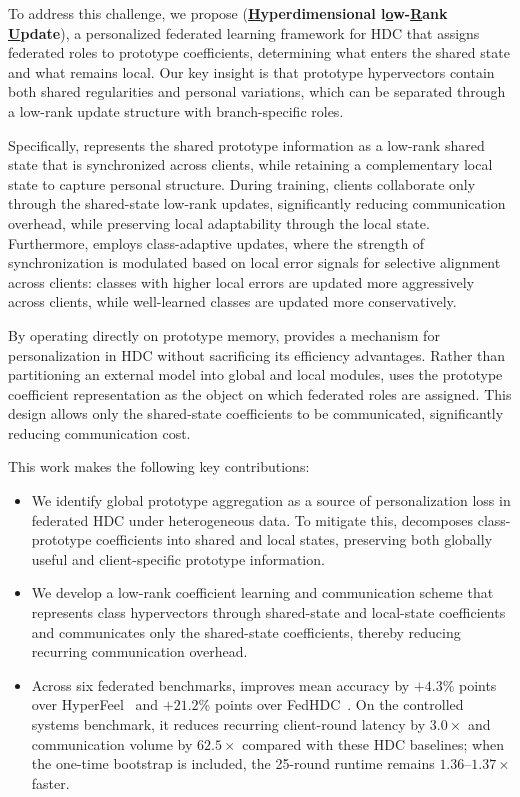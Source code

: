 \documentclass[lettersize,journal]{IEEEtran}
\newcommand{\rev}[1]{#1}
\begin{document}
To address this challenge, we propose \Design (\textbf{\underline{H}yperdimensional l\underline{o}w-\underline{R}ank \underline{U}pdate}), a personalized federated learning framework for HDC that \rev{assigns federated roles to prototype coefficients, determining what enters the shared state and what remains local}.
Our key insight is that prototype hypervectors contain both \rev{shared regularities and personal variations}, which can be separated through a low-rank update structure \rev{with branch-specific roles}.

Specifically, \Design represents the \rev{shared prototype information} as a low-rank \rev{shared state} that is synchronized across clients, while retaining a complementary \rev{local state} to capture \rev{personal structure}.
During training, clients collaborate only through the \rev{shared-state low-rank updates}, significantly reducing communication overhead, while preserving local adaptability through the \rev{local state}.
Furthermore, \Design employs class-adaptive updates, where the strength of synchronization is modulated based on local error signals for selective alignment across clients: classes with higher local errors are updated more aggressively across clients, while well-learned classes are updated more conservatively.

By operating directly on prototype memory, \Design provides a mechanism for personalization in HDC without sacrificing its efficiency advantages.
Rather than partitioning an external model into global and local modules, \rev{\Design uses the prototype coefficient representation as the object on which federated roles are assigned}.
This design allows only the \rev{shared-state coefficients} to be communicated, significantly reducing communication cost.


This work makes the following key contributions: 
\begin{itemize}
  \item \rev{We identify global prototype aggregation as a source of personalization loss in federated HDC under heterogeneous data.
  To mitigate this, \Design decomposes class-prototype coefficients into shared and local states, preserving both globally useful and
  client-specific prototype information.}

\item We develop a low-rank \rev{coefficient} learning and communication scheme that represents class hypervectors through \rev{shared-state and local-state coefficients} and communicates only the \rev{shared-state coefficients}, \rev{thereby reducing recurring communication overhead}.

\item Across \rev{six} federated benchmarks, \Design improves mean accuracy by $+4.3$\% points over HyperFeel~\cite{li2024hyperfeel} and $+21.2$\% points over FedHDC~\cite{ergun2023federatedhyperdimensionalcomputing}.
On the controlled systems benchmark, it reduces recurring client-round latency by $3.0\times$ and communication volume by $62.5\times$ compared with these HDC baselines; \rev{when the one-time bootstrap is included, the 25-round runtime remains \(1.36\)--\(1.37\times\) faster.}
\end{itemize}
\end{document}
